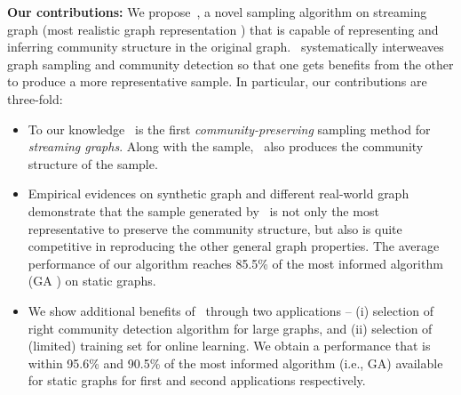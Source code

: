 {\bf Our contributions:} We propose~\compas, a novel sampling algorithm on streaming graph (most realistic graph representation \cite{aggarwal2011outlier,ahmed2014network}) that is capable of
representing and inferring community structure in the original graph. \compas~systematically interweaves graph sampling and community detection so that one gets benefits from the other to produce a more representative sample. In particular, our contributions are three-fold:
\begin{itemize}
\item To our knowledge \compas~is the first {\em community-preserving} sampling method for {\em streaming graphs}. Along with the sample, \compas~also produces the community structure of the sample.

\item Empirical evidences on synthetic graph and different real-world graph demonstrate that the sample generated by \compas~is not only the most representative to preserve the community structure, but also is quite competitive in reproducing the other general graph properties. %
The average performance of our algorithm reaches 85.5\% of the most informed algorithm (GA \cite{tong2016novel}) on static graphs.

\item We show additional benefits of \compas~through two applications -- (i) selection of right community detection algorithm for large graphs, and
(ii) selection of (limited) training set for online learning. We obtain a performance that is within 95.6\% and 90.5\% of the most informed algorithm (i.e., GA) available for static graphs for first and second applications respectively.
\end{itemize}









